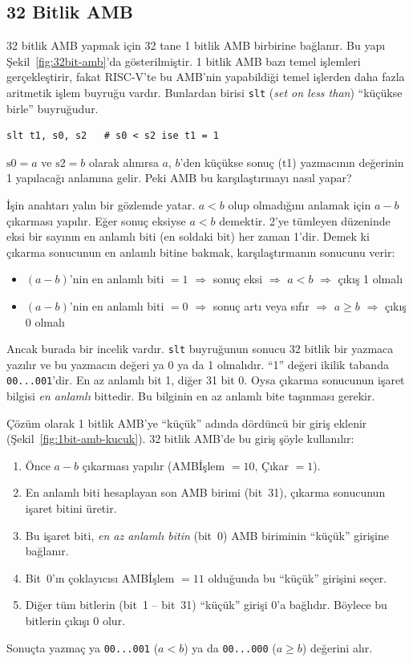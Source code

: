 \subsection{32 Bitlik AMB}
\label{sec:32bit-amb}

32 bitlik AMB yapmak için 32 tane 1 bitlik AMB birbirine bağlanır. Bu yapı Şekil~\ref{fig:32bit-amb}'da gösterilmiştir. 1 bitlik AMB bazı temel işlemleri gerçekleştirir, fakat RISC-V'te bu AMB'nin yapabildiği temel işlerden daha fazla aritmetik işlem buyruğu vardır. Bunlardan birisi \texttt{slt} (\emph{set on less than}) ``küçükse birle'' buyruğudur.

\begin{lstlisting}[style=riscv]
slt t1, s0, s2   # s0 < s2 ise t1 = 1
\end{lstlisting}

$\text{s0} = a$ ve $\text{s2} = b$ olarak alınırsa $a$, $b$'den küçükse sonuç (t1) yazmacının değerinin 1 yapılacağı anlamına gelir. Peki AMB bu karşılaştırmayı nasıl yapar?

İşin anahtarı yalın bir gözlemde yatar. $a < b$ olup olmadığını anlamak için $a - b$ çıkarması yapılır. Eğer sonuç eksiyse $a < b$ demektir. 2'ye tümleyen düzeninde eksi bir sayının en anlamlı biti (en soldaki bit) her zaman 1'dir. Demek ki çıkarma sonucunun en anlamlı bitine bakmak, karşılaştırmanın sonucunu verir:
\begin{itemize}
  \item $(a - b)$'nin en anlamlı biti $= 1$ $\Rightarrow$ sonuç eksi $\Rightarrow$ $a < b$ $\Rightarrow$ çıkış 1 olmalı
  \item $(a - b)$'nin en anlamlı biti $= 0$ $\Rightarrow$ sonuç artı veya sıfır $\Rightarrow$ $a \geq b$ $\Rightarrow$ çıkış 0 olmalı
\end{itemize}

Ancak burada bir incelik vardır. \texttt{slt} buyruğunun sonucu 32 bitlik bir yazmaca yazılır ve bu yazmacın değeri ya 0 ya da 1 olmalıdır. ``1'' değeri ikilik tabanda \texttt{00...001}'dir. En az anlamlı bit 1, diğer 31 bit 0. Oysa çıkarma sonucunun işaret bilgisi \emph{en anlamlı} bittedir. Bu bilginin en az anlamlı bite taşınması gerekir.

Çözüm olarak 1 bitlik AMB'ye ``küçük'' adında dördüncü bir giriş eklenir (Şekil~\ref{fig:1bit-amb-kucuk}). 32 bitlik AMB'de bu giriş şöyle kullanılır:
\begin{enumerate}
  \item Önce $a - b$ çıkarması yapılır (AMBİşlem $= 10$, Çıkar $= 1$).
  \item En anlamlı biti hesaplayan son AMB birimi (bit~31), çıkarma sonucunun işaret bitini üretir.
  \item Bu işaret biti, \emph{en az anlamlı bitin} (bit~0) AMB biriminin ``küçük'' girişine bağlanır.
  \item Bit~0'ın çoklayıcısı AMBİşlem $= 11$ olduğunda bu ``küçük'' girişini seçer.
  \item Diğer tüm bitlerin (bit~1 -- bit~31) ``küçük'' girişi 0'a bağlıdır. Böylece bu bitlerin çıkışı 0 olur.
\end{enumerate}
Sonuçta yazmaç ya \texttt{00...001} ($a < b$) ya da \texttt{00...000} ($a \geq b$) değerini alır.

